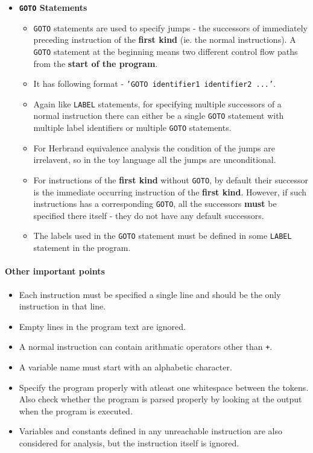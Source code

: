 \begin{itemize}
    \item \textbf{\texttt{GOTO} Statements}
    \begin{itemize} \tightlist
        \item \texttt{GOTO} statements are used to specify jumps - the 
        successors of immediately preceding instruction of the \textbf{first 
        kind} (ie. the normal instructions). A \texttt{GOTO} statement at the 
        beginning means two different control flow paths from the \textbf{start 
        of the program}.
        \item It has following format - \texttt{'GOTO identifier1 identifier2 ...'}.
        \item Again like \texttt{LABEL} statements, for specifying multiple 
        successors of a normal instruction there can either be a single \texttt{GOTO} 
        statement with multiple label identifiers or multiple \texttt{GOTO} 
        statements.
        \item For Herbrand equivalence analysis the condition of the jumps are 
        irrelavent, so in the toy language all the jumps are unconditional.
        \item For instructions of the \textbf{first kind} without \texttt{GOTO},
        by default their successor is the immediate occurring instruction of 
        the \textbf{first kind}. However, if such instructions has a 
        corresponding \texttt{GOTO}, all the successors \textbf{must} be 
        specified there itself - they do not have any default successors.
        \item The labels used in the \texttt{GOTO} statement must be defined in 
        some \texttt{LABEL} statement in the program.
    \end{itemize}
\end{itemize}

\paragraph{Other important points}
\begin{itemize} \tightlist
    \item Each instruction must be specified a single line and should be the
    only instruction in that line.
    \item Empty lines in the program text are ignored.
    \item A normal instruction can contain arithmatic operators other than \texttt{+}.
    \item A variable name must start with an alphabetic character.
    \item Specify the program properly with atleast one whitespace between the
    tokens. Also check whether the program is parsed properly by looking at
    the output when the program is executed.
    \item Variables and constants defined in any unreachable instruction are
    also considered for analysis, but the instruction itself is ignored.
\end{itemize}

